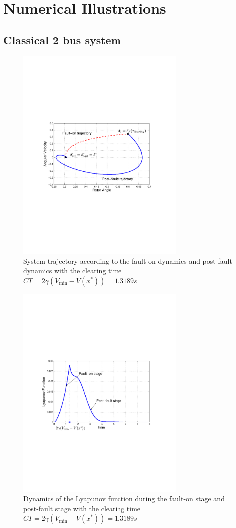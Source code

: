 \documentclass[final]{IEEEtran}
\begin{document}
\section{Numerical Illustrations}
\label{sec:simulations}

\subsection{Classical 2 bus system}
\begin{figure}[t!]
\centering
\includegraphics[width = 3.2in]{Faulton_1machine}
\caption{System trajectory according to the fault-on dynamics and
post-fault dynamics with the clearing time $CT=2\gamma
(V_{\min}-V(x^*))=1.3189 s$} \label{fig.Trajectory}
\end{figure}

\begin{figure}[t!]
\centering
\includegraphics[width = 3.2in]{FaultonLyapunov_1machine}
\caption{Dynamics of the Lyapunov function during the fault-on
stage and post-fault stage with the clearing time $CT=2\gamma
(V_{\min}-V(x^*))=1.3189 s$} \label{fig.Lyapunov}
\end{figure}
\end{document}
